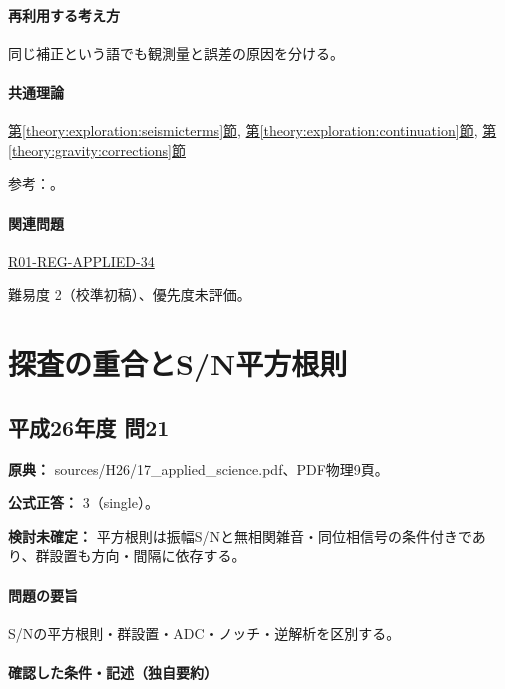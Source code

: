 \paragraph{再利用する考え方} 同じ補正という語でも観測量と誤差の原因を分ける。

\paragraph{共通理論} \hyperref[theory:exploration:seismicterms]{第\ref*{theory:exploration:seismicterms}節}, \hyperref[theory:exploration:continuation]{第\ref*{theory:exploration:continuation}節}, \hyperref[theory:gravity:corrections]{第\ref*{theory:gravity:corrections}節}

\par 参考：\cite{usgs_refraction2013,epa_seismic_reflection,usgs_static2004,usgs_processing2000,stanford_downward2001}。

\paragraph{関連問題} \hyperref[q:r01-reg-applied-34]{R01-REG-APPLIED-34}

\par 難易度 2（校準初稿）、優先度未評価。

\section{探査の重合とS/N平方根則}

\subsection{平成26年度 問21}
\label{q:h26-reg-applied-21}

\noindent\textbf{原典：} sources/H26/17\_applied\_science.pdf、PDF物理9頁。

\textbf{公式正答：} 3（single）。

\par\textbf{検討未確定：} 平方根則は振幅S/Nと無相関雑音・同位相信号の条件付きであり、群設置も方向・間隔に依存する。

\paragraph{問題の要旨} S/Nの平方根則・群設置・ADC・ノッチ・逆解析を区別する。

\paragraph{確認した条件・記述（独自要約）}\mbox{}\par

